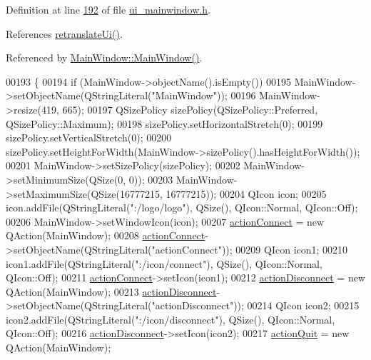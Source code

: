Definition at line \hyperlink{a00052_source_l00192}{192} of file \hyperlink{a00052_source}{ui\+\_\+mainwindow.\+h}.



References \hyperlink{a00052_source_l01867}{retranslate\+Ui()}.



Referenced by \hyperlink{a00038_source_l00024}{Main\+Window\+::\+Main\+Window()}.


\begin{DoxyCode}
00193     \{
00194         \textcolor{keywordflow}{if} (MainWindow->objectName().isEmpty())
00195             MainWindow->setObjectName(QStringLiteral(\textcolor{stringliteral}{"MainWindow"}));
00196         MainWindow->resize(419, 665);
00197         QSizePolicy sizePolicy(QSizePolicy::Preferred, QSizePolicy::Maximum);
00198         sizePolicy.setHorizontalStretch(0);
00199         sizePolicy.setVerticalStretch(0);
00200         sizePolicy.setHeightForWidth(MainWindow->sizePolicy().hasHeightForWidth());
00201         MainWindow->setSizePolicy(sizePolicy);
00202         MainWindow->setMinimumSize(QSize(0, 0));
00203         MainWindow->setMaximumSize(QSize(16777215, 16777215));
00204         QIcon icon;
00205         icon.addFile(QStringLiteral(\textcolor{stringliteral}{":/logo/logo"}), QSize(), QIcon::Normal, QIcon::Off);
00206         MainWindow->setWindowIcon(icon);
00207         \hyperlink{a00027_aa0785566311fc48271690fb68b1d4c5f}{actionConnect} = \textcolor{keyword}{new} QAction(MainWindow);
00208         \hyperlink{a00027_aa0785566311fc48271690fb68b1d4c5f}{actionConnect}->setObjectName(QStringLiteral(\textcolor{stringliteral}{"actionConnect"}));
00209         QIcon icon1;
00210         icon1.addFile(QStringLiteral(\textcolor{stringliteral}{":/icon/connect"}), QSize(), QIcon::Normal, QIcon::Off);
00211         \hyperlink{a00027_aa0785566311fc48271690fb68b1d4c5f}{actionConnect}->setIcon(icon1);
00212         \hyperlink{a00027_a8a16b3aef75b279eaaa887152d2f746b}{actionDisconnect} = \textcolor{keyword}{new} QAction(MainWindow);
00213         \hyperlink{a00027_a8a16b3aef75b279eaaa887152d2f746b}{actionDisconnect}->setObjectName(QStringLiteral(\textcolor{stringliteral}{"actionDisconnect"}));
00214         QIcon icon2;
00215         icon2.addFile(QStringLiteral(\textcolor{stringliteral}{":/icon/disconnect"}), QSize(), QIcon::Normal, QIcon::Off);
00216         \hyperlink{a00027_a8a16b3aef75b279eaaa887152d2f746b}{actionDisconnect}->setIcon(icon2);
00217         \hyperlink{a00027_a188c243f36a2dbc10e4e2a0ad94273b1}{actionQuit} = \textcolor{keyword}{new} QAction(MainWindow);

\end{DoxyCode}
